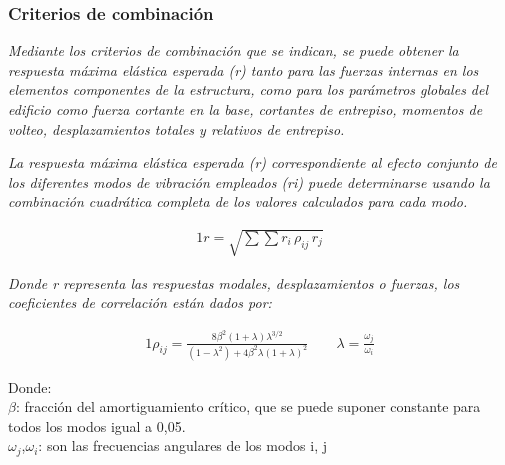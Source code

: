 \documentclass{article}%
\begin{document}
%
\subsubsection{Criterios de combinación}%
\label{ssubsec:Criteriosdecombinacin}%
\begin{tcolorbox}[colback=gray!5!white,colframe=Maroon!75!black,fonttitle=\bfseries,title=Art. 29.3.1]%
\textit{Mediante los criterios de combinación que se indican, se puede obtener la respuesta máxima elástica esperada (r) tanto para las fuerzas internas en los elementos componentes de la estructura, como para los parámetros globales  del edificio como fuerza cortante en la base, cortantes de entrepiso, momentos  de volteo, desplazamientos totales y relativos de entrepiso.}%
\end{tcolorbox}%
\begin{tcolorbox}[colback=gray!5!white,colframe=Maroon!75!black,fonttitle=\bfseries,title=Art. 29.3.2]%
\textit{La respuesta máxima elástica esperada (r) correspondiente al efecto conjunto  de  los  diferentes  modos  de  vibración  empleados  (ri)  puede determinarse usando la combinación cuadrática completa de los valores calculados para cada modo.}%
\end{tcolorbox}%
\begin{alignat}{1}%
r=\sqrt{\sum \sum r_{i}\,\rho _{ij}\,r_{j}}%
\end{alignat}%
\begin{tcolorbox}[colback=gray!5!white,colframe=Maroon!75!black,fonttitle=\bfseries,title=Art. 29.3.3]%
\textit{Donde r representa las respuestas modales, desplazamientos o fuerzas, los coeficientes de correlación están dados por:}%
\end{tcolorbox}%
\begin{alignat}{1}%
\rho_{ij}=\frac{8\beta ^{2}\left ( 1+\lambda  \right )\lambda ^{3/2}}{\left ( 1-\lambda ^{2} \right )+4\beta ^{2}\lambda \left ( 1+\lambda  \right )^{2}}\quad\quad  \lambda =\frac{\omega _{j}}{\omega _{i}}%
\end{alignat}%
\begin{flushleft}%
Donde:\\%
$\beta$: fracción del amortiguamiento crítico, que se puede suponer constante para todos los modos igual a 0,05.\\%
$\omega _{j}$,$\omega _{i}$: son las frecuencias angulares de los modos i, j\\%
\end{flushleft}

%
\end{document}
